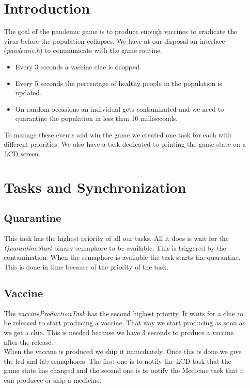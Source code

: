 \documentclass[a4paper, twoside, 12pt]{article}
\begin{document}
\section{Introduction}
The goal of the pandemic game is to produce enough vaccines to eradicate the virus
before the population collapses. We have at our disposal an interface (\textit{pandemic.h})
to communicate with the game routine.\\
\begin{itemize}
	\item Every 3 seconds a vaccine clue is dropped.
	\item Every 5 seconds the percentage of healthy people in the population is updated.
	\item On random occasions an individual gets contaminated and we need to quarantine
	      the population in less than 10 milliseconds.
\end{itemize}
To manage these events and win the game we created one task for each with different
priorities. We also have a task dedicated to printing the game state on a LCD screen.

\section{Tasks and Synchronization}
\subsection{Quarantine}
This task has the highest priority of all our tasks. All it does is wait for the
\textit{QuarantineStart} binary semaphore to be available. This is triggered by the contamination.
When the semaphore is available the task starts the quarantine. This is done in time because
of the priority of the task.

\subsection{Vaccine}
The \textit{vaccineProductionTask} has the second highest priority. It waits for a clue to be
released to start producing a vaccine. That way we start producing as soon as we get a
clue. This is needed because we have 3 seconds to produce a vaccine after the release.\\
When the vaccine is produced we ship it immediately. Once this is done we give the lcd
and lab semaphores. The first one is to notify the LCD task that the game state has changed
and the second one is to notify the Medicine task that it can producce or ship a medicine.
\end{document}
